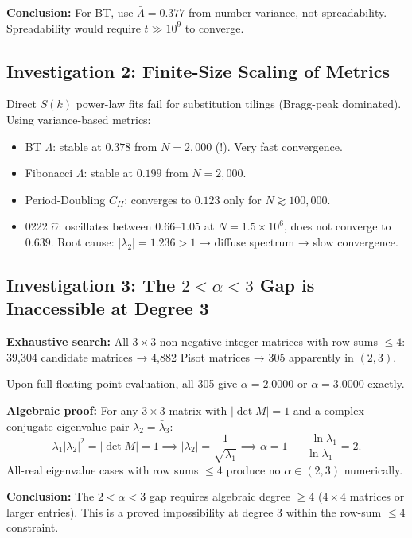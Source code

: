 \documentclass[11pt,letterpaper]{article}
\begin{document}
\textbf{Conclusion:} For BT, use $\bar\Lambda = 0.377$ from number variance, not spreadability.
Spreadability would require $t \gg 10^9$ to converge.

\subsection{Investigation 2: Finite-Size Scaling of Metrics}

Direct $S(k)$ power-law fits fail for substitution tilings (Bragg-peak dominated).
Using variance-based metrics:

\begin{itemize}[leftmargin=1.5em]
  \item BT $\bar\Lambda$: stable at $0.378$ from $N=2{,}000$ (!). Very fast convergence.
  \item Fibonacci $\bar\Lambda$: stable at $0.199$ from $N=2{,}000$.
  \item Period-Doubling $C_{II}$: converges to $0.123$ only for $N \gtrsim 100{,}000$.
  \item 0222 $\hat\alpha$: oscillates between $0.66$–$1.05$ at $N=1.5\times10^6$, does not
    converge to $0.639$. Root cause: $|\lambda_2|=1.236>1$ → diffuse spectrum → slow convergence.
\end{itemize}

\subsection{Investigation 3: The $2 < \alpha < 3$ Gap is Inaccessible at Degree 3}

\textbf{Exhaustive search:} All $3\times3$ non-negative integer matrices with row sums $\leq4$:
39,304 candidate matrices → 4,882 Pisot matrices → 305 apparently in $(2,3)$.

Upon full floating-point evaluation, all 305 give $\alpha = 2.0000$ or $\alpha = 3.0000$ exactly.

\textbf{Algebraic proof:} For any $3\times3$ matrix with $|\det M|=1$ and a complex conjugate
eigenvalue pair $\lambda_2=\bar\lambda_3$:
\[
\lambda_1|\lambda_2|^2 = |\det M| = 1 \implies |\lambda_2| = \frac{1}{\sqrt{\lambda_1}}
\implies \alpha = 1 - \frac{-\ln\lambda_1}{\ln\lambda_1} = 2.
\]
All-real eigenvalue cases with row sums $\leq4$ produce no $\alpha\in(2,3)$ numerically.

\textbf{Conclusion:} The $2<\alpha<3$ gap requires algebraic degree $\geq4$ ($4\times4$ matrices
or larger entries). This is a proved impossibility at degree 3 within the row-sum $\leq4$ constraint.
\end{document}
